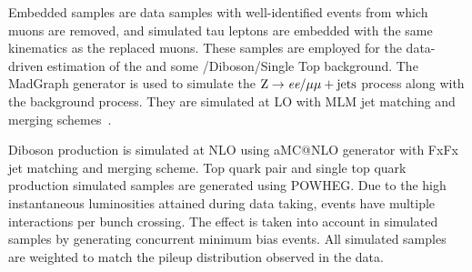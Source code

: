 Embedded samples are data samples with well-identified \Zmm events from which muons are removed, and simulated tau leptons are embedded with the same kinematics as the replaced muons. These samples are employed for the data-driven estimation of the \Ztt and some \ttbar/Diboson/Single Top background. The MadGraph generator is used to simulate the $\text{Z} \to \textit{e} \textit{e}/\mu{}\mu + \text{jets}$ process along with the \wjets background process. They are simulated at LO with MLM jet matching and merging schemes~\cite{Alwall:2007fs}.

Diboson production is simulated at NLO using aMC@NLO generator with FxFx jet matching and merging scheme. Top quark pair and single top quark production simulated samples are generated using POWHEG. Due to the high instantaneous luminosities attained during data taking, events have multiple \pp interactions per bunch crossing. The effect is taken into account in simulated samples by generating concurrent minimum bias events. All simulated samples are weighted to match the pileup distribution observed in the data.
